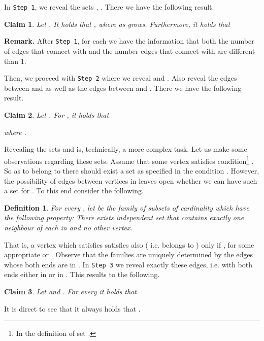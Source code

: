 \documentclass[a4paper,10pt]{article}
\newtheorem{claim}{Claim}\renewcommand{\theclaim}{\arabic{claim}}
\newtheorem{definition}{Definition}\renewcommand{\thedefinition}{\arabic{definition}}
\begin{document}
In  {\tt Step 1}, we reveal the sets , .  
There we have  the following result.


\begin{claim}\label{claim:Q1Claim}
Let .  It holds that 
,
where  as  grows. Furthermore, it holds that 

\end{claim}


\noindent
{\bf Remark.}
After {\tt Step 1}, for each  we have the information that both
the number of edges that connect  with  
and the number edges that connect  with 
are different than 1. 
\\ \vspace{-.3cm}



\noindent
Then, we proceed with {\tt Step 2} where we reveal  and 
. Also reveal the edges between  and 
as well as the edges between  and . There we have 
the following result.



\begin{claim}\label{claim:Q2Claim}
Let . For , it holds that

where .
\end{claim}

\noindent
Revealing the sets  and  is, technically,
a more complex task. Let us make some observations regarding these
sets. Assume that some vertex 
satisfies condition\footnote{In the definition of set .}
. So as  to belong to  there should exist a set 
as specified in the condition . However, the possibility 
of edges between vertices in  leaves open whether we 
can have such a set for . To this end consider the following.

\begin{definition}
For every , let  be the family of subsets
 of cardinality   which have the following 
property:  There exists independent set 
that contains exactly one  neighbour of each  in 
and no other vertex.
\end{definition}

\noindent
That is, a vertex  which satisfies  satisfies  also  (
i.e.  belongs to ) only if , 
for some appropriate  or .
Observe that the families  are uniquely determined by the
edges whose both ends are in . In  {\tt Step 3} we reveal
exactly these edges, i.e. with both ends either in  or in .
This results  to the following.


\begin{claim}\label{claim:GoodFraction}
Let  and .
For every  it holds that

\end{claim}
It is direct to see that it always holds that .
\end{document}
